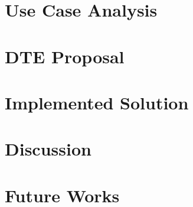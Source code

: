 \documentclass[12pt,a4paper,openright,twoside]{book}
\begin{document}
\section{Use Case Analysis}

\section{\acl{DTE} Proposal}

\section{Implemented Solution}



\section*{Discussion}

\section*{Future Works}





\backmatter



\end{document}
